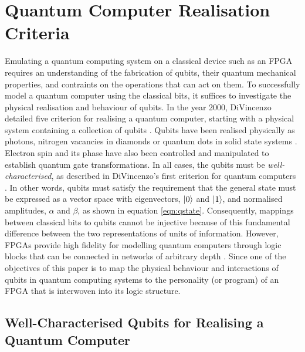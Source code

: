 \section{Quantum Computer Realisation Criteria}


Emulating a quantum computing system on a classical device such as an FPGA requires an understanding of the fabrication of qubits, their quantum mechanical properties, and contraints on the operations that can act on them. To successfully model a quantum computer using the classical bits, it suffices to investigate the physical realisation and behaviour of qubits. In the year 2000, DiVincenzo detailed five criterion for realising a quantum computer, starting with a physical system containing a collection of qubits \cite{divincenzo2000physical}. Qubits have been realised physically as photons, nitrogen vacancies in diamonds or quantum dots in solid state systems \cite{marinescu2005promise}. Electron spin and its phase have also been controlled and manipulated to establish quantum gate transformations. In all cases, the qubits must be \textit{well-characterised}, as described in DiVincenzo's first criterion for quantum computers \cite{divincenzo2000physical}. In other words, qubits must satisfy the requirement that the general state must be expressed as a vector space with eigenvectors, $\ket{0}$ and $\ket{1}$, and normalised amplitudes, $\alpha$ and $\beta$, as shown in equation \ref{eqn:qstate}. Consequently, mappings between classical bits to qubits cannot be injective because of this fundamental difference between the two representations of units of information. However, FPGAs provide high fidelity for modelling quantum computers through logic blocks that can be connected in networks of arbitrary depth \cite{wolf2004fpga}. Since one of the objectives of this paper is to map the physical behaviour and interactions of qubits in quantum computing systems to the \gls{personality} (or program) of an FPGA that is interwoven into its logic structure.

\subsection{Well-Characterised Qubits for Realising a Quantum Computer}


